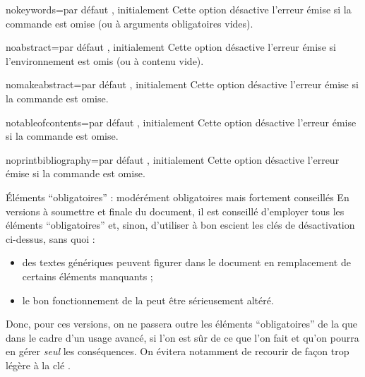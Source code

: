 \begin{description}
\begin{docKey}{nokeywords}{=\textbar{}}{par
      défaut , initialement }
    Cette option désactive l'erreur émise si la commande  est
    omise (ou à arguments obligatoires vides).
  \end{docKey}
  \begin{docKey}{noabstract}{=\textbar{}}{par
      défaut , initialement }
    Cette option désactive l'erreur émise si l'environnement 
    est omis (ou à contenu vide).
  \end{docKey}
  \begin{docKey}{nomakeabstract}{=\textbar{}}{par
      défaut , initialement }
    Cette option désactive l'erreur émise si la commande 
    est omise.
  \end{docKey}
  \begin{docKey}{notableofcontents}{=\textbar{}}{par
      défaut , initialement }
    Cette option désactive l'erreur émise si la commande
     est omise.
  \end{docKey}
  \begin{docKey}{noprintbibliography}{=\textbar{}}{par
      défaut , initialement }
    Cette option désactive l'erreur émise si la commande
     est omise.
  \end{docKey}
\end{description}

\begin{dbwarning}{Éléments \enquote{obligatoires} : modérément obligatoires
    mais fortement conseillés}{}
  En versions à soumettre et finale du document, il est conseillé d'employer
  tous les éléments \enquote{obligatoires} et, sinon, d'utiliser à bon escient
  les clés de désactivation ci-dessus, sans quoi :
  \begin{itemize}
  \item des textes génériques peuvent figurer dans le document en remplacement
    de certains éléments manquants ;
  \item le bon fonctionnement de la \yatCl{} peut être sérieusement altéré.
  \end{itemize}
  Donc, pour ces versions, on ne passera outre les éléments
  \enquote{obligatoires} de la \yatCl{} que dans le cadre d'un usage avancé, si
  l'on est sûr de ce que l'on fait et qu'on pourra en gérer \emph{seul} les
  conséquences.  On évitera notamment de recourir de façon trop légère à la clé
  .
\end{dbwarning}

